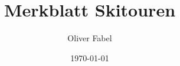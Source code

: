 \documentclass[12pt, landscape]{article}
\title{Merkblatt Skitouren}
\author{Oliver Fabel}
\date{\today}
\begin{document}
  \nocite{*}
  \begin{multicols*}{3}[]
    
    
    
    
    
    
  \end{multicols*}
\end{document}
